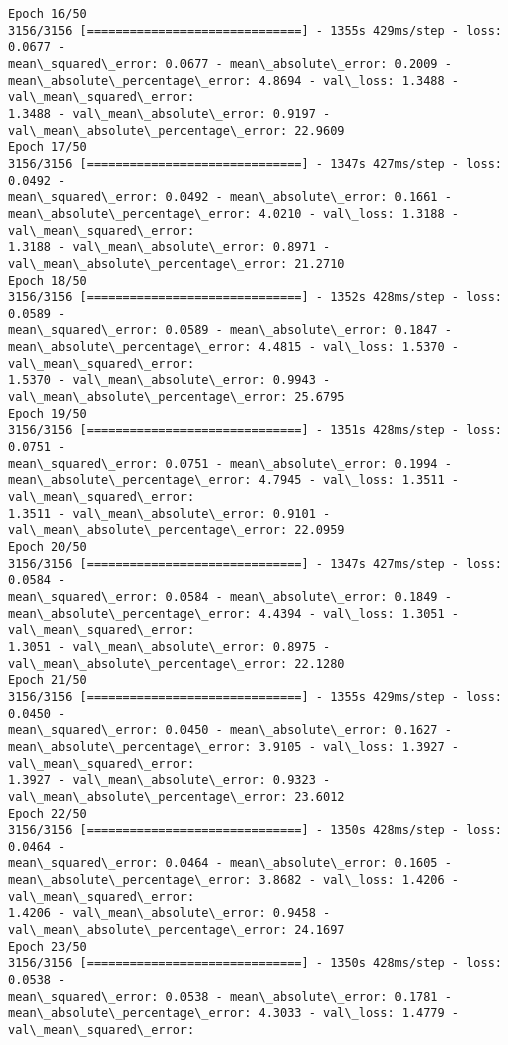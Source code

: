 \documentclass[11pt]{article}
\begin{document}
\begin{Verbatim}[commandchars=\\\{\},fontsize=\footnotesize]
Epoch 16/50
3156/3156 [==============================] - 1355s 429ms/step - loss: 0.0677 -
mean\_squared\_error: 0.0677 - mean\_absolute\_error: 0.2009 -
mean\_absolute\_percentage\_error: 4.8694 - val\_loss: 1.3488 - val\_mean\_squared\_error:
1.3488 - val\_mean\_absolute\_error: 0.9197 - val\_mean\_absolute\_percentage\_error: 22.9609
Epoch 17/50
3156/3156 [==============================] - 1347s 427ms/step - loss: 0.0492 -
mean\_squared\_error: 0.0492 - mean\_absolute\_error: 0.1661 -
mean\_absolute\_percentage\_error: 4.0210 - val\_loss: 1.3188 - val\_mean\_squared\_error:
1.3188 - val\_mean\_absolute\_error: 0.8971 - val\_mean\_absolute\_percentage\_error: 21.2710
Epoch 18/50
3156/3156 [==============================] - 1352s 428ms/step - loss: 0.0589 -
mean\_squared\_error: 0.0589 - mean\_absolute\_error: 0.1847 -
mean\_absolute\_percentage\_error: 4.4815 - val\_loss: 1.5370 - val\_mean\_squared\_error:
1.5370 - val\_mean\_absolute\_error: 0.9943 - val\_mean\_absolute\_percentage\_error: 25.6795
Epoch 19/50
3156/3156 [==============================] - 1351s 428ms/step - loss: 0.0751 -
mean\_squared\_error: 0.0751 - mean\_absolute\_error: 0.1994 -
mean\_absolute\_percentage\_error: 4.7945 - val\_loss: 1.3511 - val\_mean\_squared\_error:
1.3511 - val\_mean\_absolute\_error: 0.9101 - val\_mean\_absolute\_percentage\_error: 22.0959
Epoch 20/50
3156/3156 [==============================] - 1347s 427ms/step - loss: 0.0584 -
mean\_squared\_error: 0.0584 - mean\_absolute\_error: 0.1849 -
mean\_absolute\_percentage\_error: 4.4394 - val\_loss: 1.3051 - val\_mean\_squared\_error:
1.3051 - val\_mean\_absolute\_error: 0.8975 - val\_mean\_absolute\_percentage\_error: 22.1280
Epoch 21/50
3156/3156 [==============================] - 1355s 429ms/step - loss: 0.0450 -
mean\_squared\_error: 0.0450 - mean\_absolute\_error: 0.1627 -
mean\_absolute\_percentage\_error: 3.9105 - val\_loss: 1.3927 - val\_mean\_squared\_error:
1.3927 - val\_mean\_absolute\_error: 0.9323 - val\_mean\_absolute\_percentage\_error: 23.6012
Epoch 22/50
3156/3156 [==============================] - 1350s 428ms/step - loss: 0.0464 -
mean\_squared\_error: 0.0464 - mean\_absolute\_error: 0.1605 -
mean\_absolute\_percentage\_error: 3.8682 - val\_loss: 1.4206 - val\_mean\_squared\_error:
1.4206 - val\_mean\_absolute\_error: 0.9458 - val\_mean\_absolute\_percentage\_error: 24.1697
Epoch 23/50
3156/3156 [==============================] - 1350s 428ms/step - loss: 0.0538 -
mean\_squared\_error: 0.0538 - mean\_absolute\_error: 0.1781 -
mean\_absolute\_percentage\_error: 4.3033 - val\_loss: 1.4779 - val\_mean\_squared\_error:

\end{Verbatim}
\end{document}

